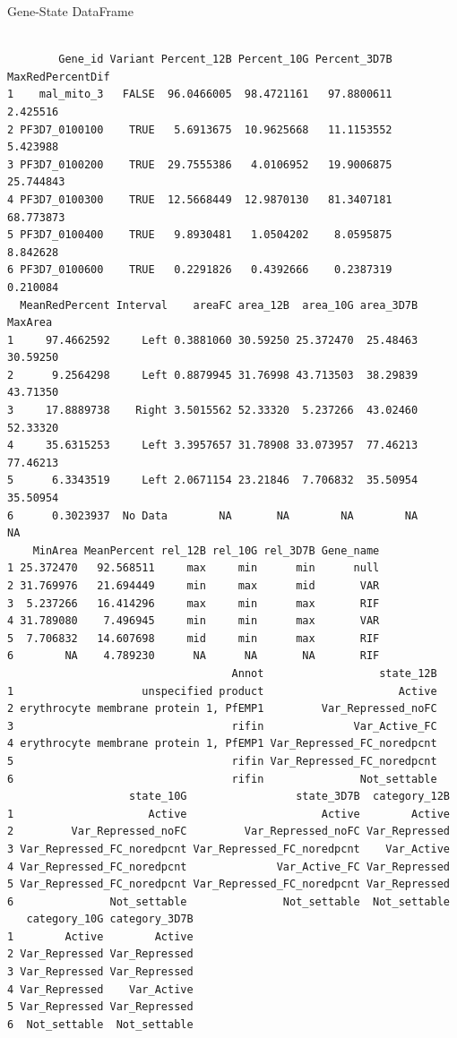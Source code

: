 \documentclass[11pt]{article}
\begin{document}
Gene-State DataFrame
\begin{verbatim}

        Gene_id Variant Percent_12B Percent_10G Percent_3D7B MaxRedPercentDif
1    mal_mito_3   FALSE  96.0466005  98.4721161   97.8800611         2.425516
2 PF3D7_0100100    TRUE   5.6913675  10.9625668   11.1153552         5.423988
3 PF3D7_0100200    TRUE  29.7555386   4.0106952   19.9006875        25.744843
4 PF3D7_0100300    TRUE  12.5668449  12.9870130   81.3407181        68.773873
5 PF3D7_0100400    TRUE   9.8930481   1.0504202    8.0595875         8.842628
6 PF3D7_0100600    TRUE   0.2291826   0.4392666    0.2387319         0.210084
  MeanRedPercent Interval    areaFC area_12B  area_10G area_3D7B  MaxArea
1     97.4662592     Left 0.3881060 30.59250 25.372470  25.48463 30.59250
2      9.2564298     Left 0.8879945 31.76998 43.713503  38.29839 43.71350
3     17.8889738    Right 3.5015562 52.33320  5.237266  43.02460 52.33320
4     35.6315253     Left 3.3957657 31.78908 33.073957  77.46213 77.46213
5      6.3343519     Left 2.0671154 23.21846  7.706832  35.50954 35.50954
6      0.3023937  No Data        NA       NA        NA        NA       NA
    MinArea MeanPercent rel_12B rel_10G rel_3D7B Gene_name
1 25.372470   92.568511     max     min      min      null
2 31.769976   21.694449     min     max      mid       VAR
3  5.237266   16.414296     max     min      max       RIF
4 31.789080    7.496945     min     min      max       VAR
5  7.706832   14.607698     mid     min      max       RIF
6        NA    4.789230      NA      NA       NA       RIF
                                   Annot                  state_12B
1                    unspecified product                     Active
2 erythrocyte membrane protein 1, PfEMP1         Var_Repressed_noFC
3                                  rifin              Var_Active_FC
4 erythrocyte membrane protein 1, PfEMP1 Var_Repressed_FC_noredpcnt
5                                  rifin Var_Repressed_FC_noredpcnt
6                                  rifin               Not_settable
                   state_10G                 state_3D7B  category_12B
1                     Active                     Active        Active
2         Var_Repressed_noFC         Var_Repressed_noFC Var_Repressed
3 Var_Repressed_FC_noredpcnt Var_Repressed_FC_noredpcnt    Var_Active
4 Var_Repressed_FC_noredpcnt              Var_Active_FC Var_Repressed
5 Var_Repressed_FC_noredpcnt Var_Repressed_FC_noredpcnt Var_Repressed
6               Not_settable               Not_settable  Not_settable
   category_10G category_3D7B
1        Active        Active
2 Var_Repressed Var_Repressed
3 Var_Repressed Var_Repressed
4 Var_Repressed    Var_Active
5 Var_Repressed Var_Repressed
6  Not_settable  Not_settable
\end{verbatim}
\end{document}
